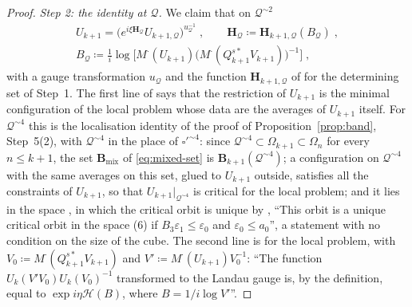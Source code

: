 \documentclass[11pt]{preprint}
\numberwithin{equation}{section}
\theoremstyle{definition}
\theoremstyle{remark}
\theoremstyle{plain}
\begin{document}
\begin{proof}
\emph{Step 2: the identity \cite[(3.17)]{BalabanCRE} at $\mathcal Q$.} We claim that on $\mathcal Q^{\sim2}$
\begin{equation}\label{eq:local-representation}
\begin{gathered}
    U_{k+1} = \bigl(e^{i\xi\mathbf H_{\mathcal Q}}U_{k+1,\mathcal Q}\bigr)^{u_{\mathcal Q}^{-1}}\;,
    \qquad
    \mathbf H_{\mathcal Q} \coloneqq \mathbf H_{k+1,\mathcal Q}(B_{\mathcal Q})\;,\\
    B_{\mathcal Q} \coloneqq \frac{1}{i}\log\bigl[M^\cdot(U_{k+1})\bigl(M^\cdot(Q^{s*}_{k+1}V_{k+1})\bigr)^{-1}\bigr]\;,
\end{gathered}
\end{equation}
with a gauge transformation $u_{\mathcal Q}$ and the function $\mathbf H_{k+1,\mathcal Q}$ of \cite[Proposition~9, p.~309]{BalabanVAR} for the determining set of Step~1. The first line of \cite[(3.17)]{BalabanCRE} says that the restriction of $U_{k+1}$ is the minimal configuration of the local problem whose data are the averages of $U_{k+1}$ itself. For $\mathcal Q^{\sim4}$ this is the localisation identity of the proof of Proposition~\ref{prop:band}, Step~5(2), with $\mathcal Q^{\sim4}$ in the place of $\square'^{\sim4}$: since $\mathcal Q^{\sim4} \subset \Omega_{k+1} \subset \Omega_n$ for every $n \leq k + 1$, the set $\mathbf B_{\mathrm{mix}}$ of \eqref{eq:mixed-set} is $\mathbf B_{k+1}(\mathcal Q^{\sim4})$; a configuration on $\mathcal Q^{\sim4}$ with the same averages on this set, glued to $U_{k+1}$ outside, satisfies all the constraints of $U_{k+1}$, so that $U_{k+1}|_{\mathcal Q^{\sim4}}$ is critical for the local problem; and it lies in the space \cite[(6), p.~278]{BalabanVAR}, in which the critical orbit is unique by \cite[Theorem~1]{BalabanVAR}, ``This orbit is a unique critical orbit in the space (6) if $B_3\varepsilon_1 \leq \varepsilon_0$ and $\varepsilon_0 \leq a_0$'', a statement with no condition on the size of the cube. The second line is \cite[Proposition~9]{BalabanVAR} for the local problem, with $V_0 \coloneqq M^\cdot(Q^{s*}_{k+1}V_{k+1})$ and $V' \coloneqq M^\cdot(U_{k+1})V_0^{-1}$: ``The function $U_k(V'V_0)U_k(V_0)^{-1}$ transformed to the Landau gauge is, by the definition, equal to $\exp i\eta\mathscr H(B)$, where $B = 1/i\log V'$''.


\end{proof}
\end{document}
